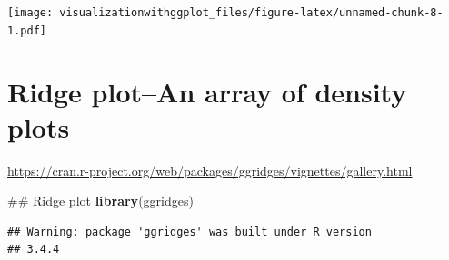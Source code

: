 \documentclass[]{krantz}
\makeatletter
\newenvironment{Shaded}{\begin{snugshade}}{\end{snugshade}}
\newcommand{\KeywordTok}[1]{\textcolor[rgb]{0.13,0.29,0.53}{\textbf{#1}}}
\newcommand{\DataTypeTok}[1]{\textcolor[rgb]{0.13,0.29,0.53}{#1}}
\newcommand{\DecValTok}[1]{\textcolor[rgb]{0.00,0.00,0.81}{#1}}
\newcommand{\FloatTok}[1]{\textcolor[rgb]{0.00,0.00,0.81}{#1}}
\newcommand{\StringTok}[1]{\textcolor[rgb]{0.31,0.60,0.02}{#1}}
\newcommand{\OperatorTok}[1]{\textcolor[rgb]{0.81,0.36,0.00}{\textbf{#1}}}
\newcommand{\NormalTok}[1]{#1}
\newenvironment{kframe}{%
\medskip{}
\setlength{\fboxsep}{.8em}
 \def\at@end@of@kframe{}%
 \ifinner\ifhmode%
  \def\at@end@of@kframe{\end{minipage}}%
  \begin{minipage}{\columnwidth}%
 \fi\fi%
 \def\FrameCommand##1{\hskip\@totalleftmargin \hskip-\fboxsep
 \colorbox{shadecolor}{##1}\hskip-\fboxsep
     \hskip-\linewidth \hskip-\@totalleftmargin \hskip\columnwidth}%
 \MakeFramed {\advance\hsize-\width
   \@totalleftmargin\z@ \linewidth\hsize
   \@setminipage}}%
 {\par\unskip\endMakeFramed%
 \at@end@of@kframe}
\renewenvironment{Shaded}{\begin{kframe}}{\end{kframe}}
\theoremstyle{definition}
\theoremstyle{definition}
\theoremstyle{definition}
\theoremstyle{remark}
\makeatother
\begin{document}
\begin{Shaded}
\end{Shaded}

\texttt{[image: visualizationwithggplot\_files/figure-latex/unnamed-chunk-8-1.pdf]}

\section{Ridge plot--An array of density
plots}\label{ridge-plotan-array-of-density-plots}

\url{https://cran.r-project.org/web/packages/ggridges/vignettes/gallery.html}

\begin{Shaded}
\begin{Highlighting}[]
\NormalTok{## Ridge plot}
\KeywordTok{library}\NormalTok{(ggridges)}
\end{Highlighting}
\end{Shaded}

\begin{verbatim}
## Warning: package 'ggridges' was built under R version
## 3.4.4
\end{verbatim}
\end{document}
